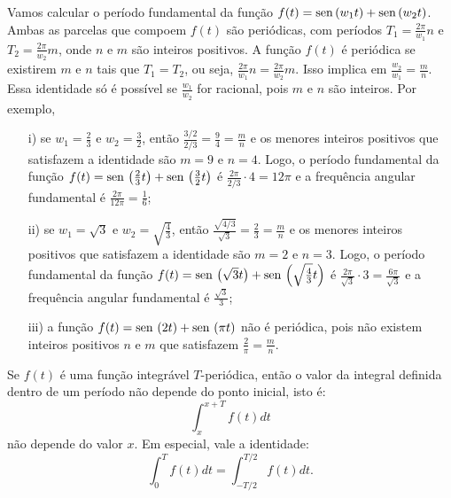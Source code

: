 \begin{ex} Vamos calcular o período fundamental da função $f(t)=\operatorname{sen}\,(w_1t)+\operatorname{sen}\,(w_2t)$. Ambas as parcelas que compoem $f(t)$ são periódicas, com períodos $T_1=\frac{2\pi}{w_1}n$ e $T_2=\frac{2\pi}{w_2}m$, onde $n$ e $m$ são inteiros positivos. A função $f(t)$ é periódica se existirem $m$ e $n$ tais que $T_1=T_2$, ou seja, $\frac{2\pi}{w_1}n=\frac{2\pi}{w_2}m$. Isso implica em $\frac{w_2}{w_1}=\frac{m}{n}$. Essa identidade só é possível se $\frac{w_1}{w_2}$ for racional, pois $m$ e $n$ são inteiros. Por exemplo, 
\begin{itemize}
 \item[i)] se $w_1=\frac{2}{3}$ e $w_2=\frac{3}{2}$, então $\frac{3/2}{2/3}=\frac{9}{4}=\frac{m}{n}$ e os menores inteiros positivos que satisfazem a identidade são $m=9$ e $n=4$. Logo, o período fundamental da função $f(t)=\operatorname{sen}\,\left(\frac{2}{3}t\right)+\operatorname{sen}\,\left(\frac{3}{2}t\right)$ é $\frac{2\pi}{2/3}\cdot 4= 12\pi$ e a frequência angular fundamental é $\frac{2\pi}{12\pi}=\frac{1}{6}$; 
 \item[ii)] se $w_1=\sqrt{3}$ e $w_2=\sqrt{\frac{4}{3}}$, então $\frac{\sqrt{4/3}}{\sqrt{3}}=\frac{2}{3}=\frac{m}{n}$ e os menores inteiros positivos que satisfazem a identidade são $m=2$ e $n=3$. Logo, o período fundamental da função $f(t)=\operatorname{sen}\,\left(\sqrt{3}t\right)+\operatorname{sen}\,\left(\sqrt{\frac{4}{3}}t\right)$ é $\frac{2\pi}{\sqrt{3}}\cdot 3= \frac{6\pi}{\sqrt{3}}$ e a frequência angular fundamental é $\frac{\sqrt{3}}{3}$; 
 \item[iii)] a função $f(t)=\operatorname{sen}\,\left(2t\right)+\operatorname{sen}\,\left(\pi t\right)$ não é periódica, pois não existem inteiros positivos $n$ e $m$ que satisfazem $\frac{2}{\pi}=\frac{m}{n}$.
 \end{itemize}
\end{ex}
\begin{teo} Se $f(t)$ é uma função integrável $T$-periódica, então o valor da integral definida dentro de um período não depende do ponto inicial, isto é:
\begin{equation}\int_{x}^{x+T} f(t)dt \end{equation}
não depende do valor $x$. Em especial, vale a identidade:
\begin{equation}\int_{0}^{T} f(t)dt= \int_{-T/2}^{T/2} f(t)dt.\end{equation}
 \end{teo}

